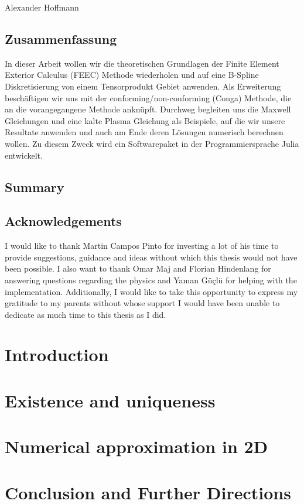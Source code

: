 \documentclass[12pt,a4paper,times]{report}
\numberwithin{equation}{section}
\numberwithin{figure}{section}
\numberwithin{lemma}{section}
\theoremstyle{definition}
\begin{document}
\noindent\hspace{1cm} Alexander Hoffmann
    \vspace{1cm}
\newpage
\thispagestyle{empty}
\section*{Zusammenfassung}
In dieser Arbeit wollen wir die theoretischen Grundlagen der Finite Element Exterior Calculus (FEEC) Methode wiederholen und auf eine B-Spline Diskretisierung von einem Tensorprodukt Gebiet anwenden. Als Erweiterung beschäftigen wir uns mit der conforming/non-conforming (Conga) Methode, die an die vorangegangene Methode anknüpft. Durchweg begleiten uns die Maxwell Gleichungen und eine kalte Plasma Gleichung als Beispiele, auf die wir unsere Resultate anwenden und auch am Ende deren Lösungen numerisch berechnen wollen. Zu diesem Zweck wird ein Softwarepaket in der Programmiersprache Julia entwickelt. 
\vspace{1cm}
\section*{Summary}

\newpage

\thispagestyle{empty}
\section*{Acknowledgements}
I would like to thank Martin Campos Pinto for investing a lot of his time 
to provide suggestions, guidance and ideas without which this thesis would not have 
been possible. I also want to thank Omar Maj and Florian Hindenlang for answering questions regarding the physics 
and Yaman Güçlü for helping with the implementation. Additionally, I would like to take 
this opportunity to express my gratitude to my parents without whose support I would have 
been unable to dedicate as much time to this thesis as I did.
\newpage

\tableofcontents
\newpage
{}
\setcounter{page}{1}

\chapter{Introduction}\label{chap:introduction}

\chapter{Existence and uniqueness}\label{chap:existence_and_uniqueness}

\chapter{Numerical approximation in 2D}\label{chap:approximation_in_2D}

\chapter{Conclusion and Further Directions}\label{chap:conclusion}

\printbibliography
\end{document}
